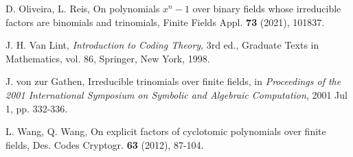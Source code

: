 \documentclass[10pt,reqno]{amsart}
\theoremstyle{definition}
\theoremstyle{remark}
\numberwithin{equation}{section}
\begin{document}
\begin{thebibliography}{99}
\bibitem{[OR21]} D. Oliveira, L. Reis, On polynomials $x^n-1$ over binary fields whose irreducible factors are binomials and trinomials, Finite Fields Appl. \textbf{73} (2021), 101837.

\bibitem{[Van98]} J. H. Van Lint, \textit{Introduction to Coding Theory}, 3rd ed., Graduate Texts in Mathematics, vol. 86, Springer, New York, 1998.

\bibitem{[vZG01]} J. von zur Gathen, Irreducible trinomials over finite fields, in \textit{Proceedings of the 2001 International Symposium on Symbolic and Algebraic Computation}, 2001 Jul 1, pp. 332-336.

\bibitem{[WW12]} L. Wang, Q. Wang, On explicit factors of cyclotomic polynomials over finite fields, Des. Codes Cryptogr. \textbf{63} (2012), 87-104.

\end{thebibliography}
\end{document}
